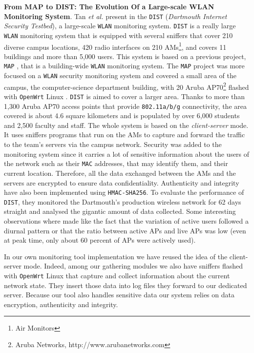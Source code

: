 \textbf{From MAP to DIST: The Evolution Of a Large-scale WLAN Monitoring System}. Tan \textit{et al.} present in \citep{article3} the \texttt{DIST} (\textit{Dartmouth Internet Security Testbed}), a large-scale \texttt{WLAN} monitoring system. \texttt{DIST} is a really large \texttt{WLAN} monitoring system that is equipped with several sniffers that cover 210 diverse campus locations, 420 radio interfaces on 210 AMs\footnote{Air Monitors}, and covers 11 buildings and more than 5,000 users. This system is based on a previous project, \texttt{MAP} \cite{MAP}, that is a building-wide \texttt{WLAN} monitoring system. The \texttt{MAP} project was more focused on a \texttt{WLAN} security monitoring system and covered a small area of the campus, the computer-science department building, with 20 Aruba AP70\footnote{Aruba Networks, http://www.arubanetworks.com} flashed with \texttt{OpenWrt} Linux \cite{openwrt}. \texttt{DIST} is aimed to cover a larger area. Thanks to more than 1,300 Aruba AP70 access points that provide \texttt{802.11a/b/g} connectivity, the area covered is about 4.6 square kilometers and is populated by over 6,000 students and 2,500 faculty and staff. The whole system is based on the \textit{client-server} mode. It uses sniffers programs that run on the AMs to capture and forward the traffic to the team's servers via the campus network. Security was added to the monitoring system since it carries a lot of sensitive information about the users of the network such as their \texttt{MAC} addresses, that may identify them, and their current location. Therefore, all the data exchanged between the AMs and the servers are encrypted to ensure data confidentiality. Authenticity and integrity have also been implemented using \texttt{HMAC-SHA256}. To evaluate the performance of \texttt{DIST}, they monitored the Dartmouth's production wireless network for 62 days straight and analysed the gigantic amount of data collected. Some interesting observations where made like the fact that the variation of active users followed a diurnal pattern or that the ratio between active APs and live APs was low (even at peak time, only about 60 percent of APs were actively used).

In our own monitoring tool implementation we have reused the idea of the client-server mode. Indeed, among our gathering modules we also have sniffers flashed with \texttt{OpenWrt} Linux that capture and collect information about the current network state. They insert those data into log files they forward to our dedicated server. Because our tool also handles sensitive data our system relies on data encryption, authenticity and integrity.


